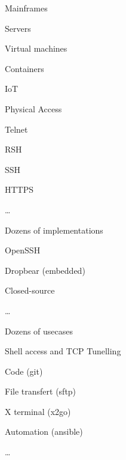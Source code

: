 \titleSlide
{}
\inuitsSlide



\begin{iframe}
\item Mainframes
\item Servers
\item Virtual machines
\item Containers
\item IoT
\end{iframe}

\begin{iframe}
\item Physical Access
\item Telnet
\item RSH
\item SSH
\item HTTPS
\item \dots
\end{iframe}

\begin{iframe}[SSH]
\item Dozens of implementations
\item OpenSSH
\item Dropbear (embedded)
\item Closed-source
\item \dots
\end{iframe}

\begin{iframe}[SSH]
\item Dozens of usecases
\item Shell access and TCP Tunelling
\item Code (git)
\item File transfert (sftp)
\item X terminal (x2go)
\item Automation (ansible)
\item \dots
\end{iframe}


